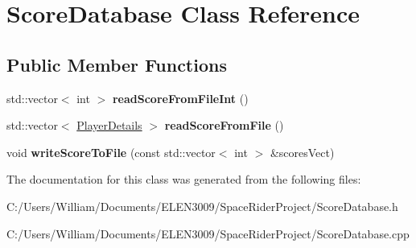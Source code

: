 \hypertarget{class_score_database}{}\section{Score\+Database Class Reference}
\label{class_score_database}
\subsection*{Public Member Functions}
\begin{DoxyCompactItemize}
\item 
\mbox{\label{class_score_database_a64030d31fa7a362d17de1172fed3189f}} 
std\+::vector$<$ int $>$ {\bfseries read\+Score\+From\+File\+Int} ()
\item 
\mbox{\label{class_score_database_af8a707a19aa762bce143038e00029e65}} 
std\+::vector$<$ \hyperlink{struct_player_details}{Player\+Details} $>$ {\bfseries read\+Score\+From\+File} ()
\item 
\mbox{\label{class_score_database_a8e479ebb5c08413a4f34c9b0d019ff0e}} 
void {\bfseries write\+Score\+To\+File} (const std\+::vector$<$ int $>$ \&scores\+Vect)
\end{DoxyCompactItemize}


The documentation for this class was generated from the following files\+:\begin{DoxyCompactItemize}
\item 
C\+:/\+Users/\+William/\+Documents/\+E\+L\+E\+N3009/\+Space\+Rider\+Project/Score\+Database.\+h\item 
C\+:/\+Users/\+William/\+Documents/\+E\+L\+E\+N3009/\+Space\+Rider\+Project/Score\+Database.\+cpp\end{DoxyCompactItemize}

